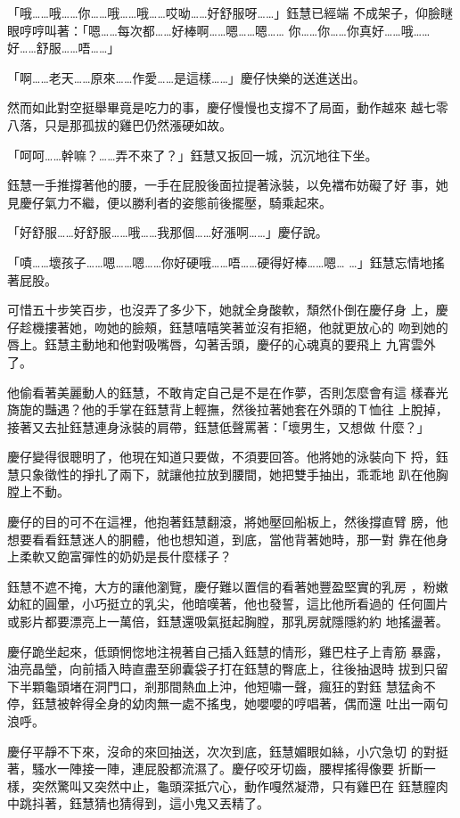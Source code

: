 「哦……哦……你……哦……哦……哎呦……好舒服呀……」鈺慧已經端
不成架子，仰臉瞇眼哼哼叫著：「嗯……每次都……好棒啊……嗯……嗯……
你……你……你真好……哦……好……舒服……唔……」

「啊……老天……原來……作愛……是這樣……」慶仔快樂的送進送出。

然而如此對空挺舉畢竟是吃力的事，慶仔慢慢也支撐不了局面，動作越來
越七零八落，只是那孤拔的雞巴仍然漲硬如故。

「呵呵……幹嘛？……弄不來了？」鈺慧又扳回一城，沉沉地往下坐。

鈺慧一手推撐著他的腰，一手在屁股後面拉提著泳裝，以免襠布妨礙了好
事，她見慶仔氣力不繼，便以勝利者的姿態前後擺壓，騎乘起來。

「好舒服……好舒服……哦……我那個……好漲啊……」慶仔說。

「嘖……壞孩子……嗯……嗯……你好硬哦……唔……硬得好棒……嗯…
…」鈺慧忘情地搖著屁股。

可惜五十步笑百步，也沒弄了多少下，她就全身酸軟，頹然仆倒在慶仔身
上，慶仔趁機摟著她，吻她的臉頰，鈺慧嘻嘻笑著並沒有拒絕，他就更放心的
吻到她的唇上。鈺慧主動地和他對吸嘴唇，勾著舌頭，慶仔的心魂真的要飛上
九宵雲外了。

他偷看著美麗動人的鈺慧，不敢肯定自己是不是在作夢，否則怎麼會有這
樣春光旖旎的豔遇？他的手掌在鈺慧背上輕撫，然後拉著她套在外頭的Ｔ恤往
上脫掉，接著又去扯鈺慧連身泳裝的肩帶，鈺慧低聲罵著：「壞男生，又想做
什麼？」

慶仔變得很聰明了，他現在知道只要做，不須要回答。他將她的泳裝向下
捋，鈺慧只象徵性的掙扎了兩下，就讓他拉放到腰間，她把雙手抽出，乖乖地
趴在他胸膛上不動。

慶仔的目的可不在這裡，他抱著鈺慧翻滾，將她壓回船板上，然後撐直臂
膀，他想要看看鈺慧迷人的胴體，他也想知道，到底，當他背著她時，那一對
靠在他身上柔軟又飽富彈性的奶奶是長什麼樣子？

鈺慧不遮不掩，大方的讓他瀏覽，慶仔難以置信的看著她豐盈堅實的乳房
，粉嫩幼紅的圓暈，小巧挺立的乳尖，他暗嘆著，他也發誓，這比他所看過的
任何圖片或影片都要漂亮上一萬倍，鈺慧還吸氣挺起胸膛，那乳房就隱隱約約
地搖盪著。

慶仔跪坐起來，低頭惘惚地注視著自己插入鈺慧的情形，雞巴柱子上青筋
暴露，油亮晶瑩，向前插入時直盡至卵囊袋子打在鈺慧的臀底上，往後抽退時
拔到只留下半顆龜頭堵在洞門口，剎那間熱血上沖，他短嘯一聲，瘋狂的對鈺
慧猛肏不停，鈺慧被幹得全身的幼肉無一處不搖曳，她嚶嚶的哼唱著，偶而還
吐出一兩句浪呼。

慶仔平靜不下來，沒命的來回抽送，次次到底，鈺慧媚眼如絲，小穴急切
的對挺著，騷水一陣接一陣，連屁股都流濕了。慶仔咬牙切齒，腰桿搖得像要
折斷一樣，突然驚叫又突然中止，龜頭深抵穴心，動作嘎然凝滯，只有雞巴在
鈺慧膣肉中跳抖著，鈺慧猜也猜得到，這小鬼又丟精了。

